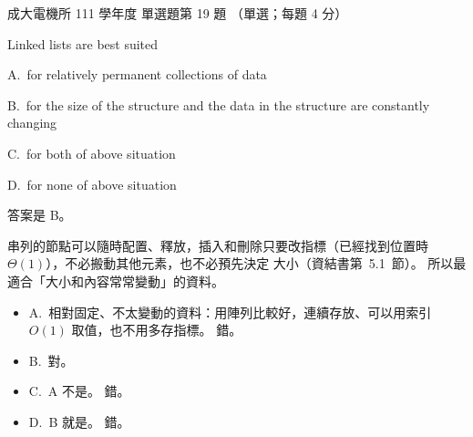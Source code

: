 \begin{pastexam}[label={px:ncku-111-ee-ds-19}]{成大電機所 111 學年度 單選題第 19 題}
（單選；每題 4 分）

Linked lists are best suited

A.~for relatively permanent collections of data

B.~for the size of the structure and the data in the structure are constantly changing

C.~for both of above situation

D.~for none of above situation
\end{pastexam}

\begin{pastsoln}
答案是 B。

串列的節點可以隨時配置、釋放，插入和刪除只要改指標（已經找到位置時 $\Theta(1)$），不必搬動其他元素，也不必預先決定
大小（資結書第~5.1~節）。 所以最適合「大小和內容常常變動」的資料。
\begin{itemize}
\item A.~相對固定、不太變動的資料：用陣列比較好，連續存放、可以用索引 $O(1)$ 取值，也不用多存指標。 錯。
\item B.~對。
\item C.~A 不是。 錯。
\item D.~B 就是。 錯。
\end{itemize}
\end{pastsoln}
